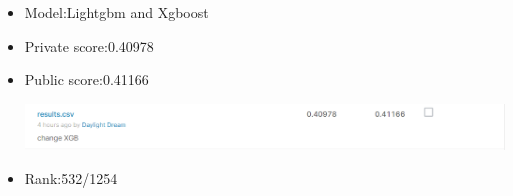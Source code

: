 \documentclass{tikzposter} %
\begin{document}
\begin{columns}
{
	\begin{itemize}
		\item Model:Lightgbm and Xgboost
		\item Private score:0.40978
		\item Public score:0.41166
		\begin{center}
			\includegraphics[scale=0.4]{figures/23.eps}
		\end{center}
		\item Rank:532/1254
	\end{itemize}
%		
%		
%	
}
\end{columns}
\end{document}
